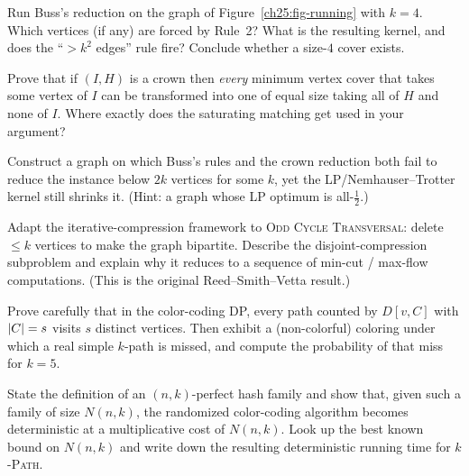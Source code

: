 \begin{exercise}
Run Buss's reduction on the graph of Figure~\ref{ch25:fig-running} with $k=4$. Which vertices (if any) are forced by Rule~2? What is the resulting kernel, and does the ``$>k^2$ edges'' rule fire? Conclude whether a size-$4$ cover exists.
\end{exercise}

\begin{exercise}
Prove that if $(I,H)$ is a crown then \emph{every} minimum vertex cover that takes some vertex of $I$ can be transformed into one of equal size taking all of $H$ and none of $I$. Where exactly does the saturating matching get used in your argument?
\end{exercise}

\begin{exercise}
Construct a graph on which Buss's rules and the crown reduction both fail to reduce the instance below $2k$ vertices for some $k$, yet the LP/Nemhauser--Trotter kernel still shrinks it. (Hint: a graph whose LP optimum is all-$\tfrac12$.)
\end{exercise}

\begin{exercise}
Adapt the iterative-compression framework to \textsc{Odd Cycle Transversal}: delete $\le k$ vertices to make the graph bipartite. Describe the disjoint-compression subproblem and explain why it reduces to a sequence of min-cut / max-flow computations. (This is the original Reed--Smith--Vetta result.)
\end{exercise}

\begin{exercise}
Prove carefully that in the color-coding DP, every path counted by $D[v,C]$ with $\lvert C\rvert=s$ visits $s$ distinct vertices. Then exhibit a (non-colorful) coloring under which a real simple $k$-path is missed, and compute the probability of that miss for $k=5$.
\end{exercise}

\begin{exercise}
State the definition of an $(n,k)$-perfect hash family and show that, given such a family of size $N(n,k)$, the randomized color-coding algorithm becomes deterministic at a multiplicative cost of $N(n,k)$. Look up the best known bound on $N(n,k)$ and write down the resulting deterministic running time for \textsc{$k$-Path}.
\end{exercise}

